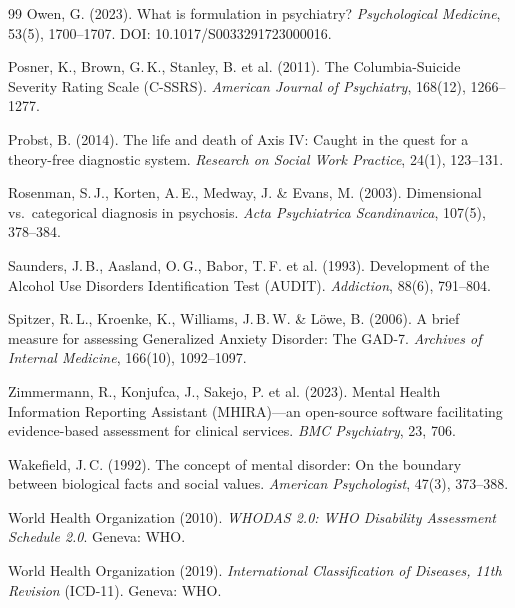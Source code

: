 \documentclass[11pt,a4paper]{article}
\begin{document}
\begin{thebibliography}{99}
Owen, G. (2023).
\newblock What is formulation in psychiatry?
\newblock \textit{Psychological Medicine}, 53(5), 1700--1707. DOI: 10.1017/S0033291723000016.

Posner, K., Brown, G.\,K., Stanley, B. et al. (2011).
\newblock The Columbia-Suicide Severity Rating Scale (C-SSRS).
\newblock \textit{American Journal of Psychiatry}, 168(12), 1266--1277.

Probst, B. (2014).
\newblock The life and death of Axis IV: Caught in the quest for a theory-free diagnostic system.
\newblock \textit{Research on Social Work Practice}, 24(1), 123--131.

Rosenman, S.\,J., Korten, A.\,E., Medway, J. \& Evans, M. (2003).
\newblock Dimensional vs.\ categorical diagnosis in psychosis.
\newblock \textit{Acta Psychiatrica Scandinavica}, 107(5), 378--384.

Saunders, J.\,B., Aasland, O.\,G., Babor, T.\,F. et al. (1993).
\newblock Development of the Alcohol Use Disorders Identification Test (AUDIT).
\newblock \textit{Addiction}, 88(6), 791--804.

Spitzer, R.\,L., Kroenke, K., Williams, J.\,B.\,W. \& L\"owe, B. (2006).
\newblock A brief measure for assessing Generalized Anxiety Disorder: The GAD-7.
\newblock \textit{Archives of Internal Medicine}, 166(10), 1092--1097.

Zimmermann, R., Konjufca, J., Sakejo, P. et al. (2023).
\newblock Mental Health Information Reporting Assistant (MHIRA)---an open-source software facilitating evidence-based assessment for clinical services.
\newblock \textit{BMC Psychiatry}, 23, 706.

Wakefield, J.\,C. (1992).
\newblock The concept of mental disorder: On the boundary between biological facts and social values.
\newblock \textit{American Psychologist}, 47(3), 373--388.

World Health Organization (2010).
\newblock \textit{WHODAS 2.0: WHO Disability Assessment Schedule 2.0}.
\newblock Geneva: WHO.

World Health Organization (2019).
\newblock \textit{International Classification of Diseases, 11th Revision} (ICD-11).
\newblock Geneva: WHO.


\end{thebibliography}
\end{document}
